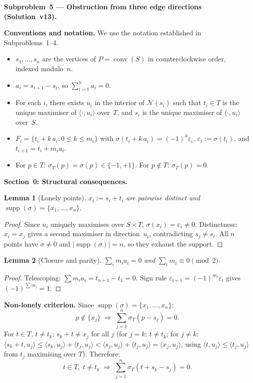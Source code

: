 \documentclass{article}
\newtheorem{lemma}{Lemma}
\begin{document}
\textbf{Subproblem~5 --- Obstruction from three edge directions (Solution~v13).}

\medskip
\noindent\textbf{Conventions and notation.}
We use the notation established in Subproblems~1--4.
\begin{itemize}
  \item $s_1,\dots,s_n$ are the vertices of $P=\operatorname{conv}(S)$ in counterclockwise
        order, indexed modulo~$n$.
  \item $a_i = s_{i+1}-s_i$, so $\sum_{i=1}^n a_i = 0$.
  \item For each $i$, there exists $u_i$ in the interior of $\mathcal{N}(s_i)$ such that
        $t_i\in T$ is the unique maximiser of $\langle\cdot,u_i\rangle$ over~$T$,
        and $s_i$ is the unique maximiser of $\langle\cdot,u_i\rangle$ over~$S$.
  \item $F_i = \{t_i+k\,a_i:0\le k\le m_i\}$ with
        $\sigma(t_i+k\,a_i)=(-1)^k\varepsilon_i$, $\varepsilon_i:=\sigma(t_i)$,
        and $t_{i+1}=t_i+m_i a_i$.
  \item For $p\in T$: $\sigma_T(p)=\sigma(p)\in\{-1,+1\}$.
        For $p\notin T$: $\sigma_T(p)=0$.
\end{itemize}

\bigskip
\noindent\textbf{Section~0: Structural consequences.}

\begin{lemma}[Lonely points]\label{lem:lonely}
$x_i:=s_i+t_i$ are pairwise distinct and
$\operatorname{supp}(\sigma)=\{x_1,\dots,x_n\}$.
\end{lemma}
\begin{proof}
Since $u_i$ uniquely maximises over $S\times T$, $\sigma(x_i)=\varepsilon_i\ne 0$.
Distinctness: $x_i=x_j$ gives a second maximiser in direction~$u_i$, contradicting $s_j\ne s_i$.
All $n$ points have $\sigma\ne 0$ and $|\operatorname{supp}(\sigma)|=n$, so they exhaust the support.
\end{proof}

\begin{lemma}[Closure and parity]\label{lem:closure}
$\sum_{i}m_i a_i=0$ and $\sum_i m_i\equiv 0\pmod{2}$.
\end{lemma}
\begin{proof}
Telescoping: $\sum m_i a_i=t_{n+1}-t_1=0$.
Sign rule $\varepsilon_{i+1}=(-1)^{m_i}\varepsilon_i$ gives $(-1)^{\sum m_i}=1$.
\end{proof}

\noindent\textbf{Non-lonely criterion.}
Since $\operatorname{supp}(\sigma)=\{x_1,\dots,x_n\}$:
\begin{equation}\label{eq:nonlonely}
  p\notin\{x_j\}
  \;\Longrightarrow\;
  \sum_{j=1}^n\sigma_T(p-s_j)=0.
\end{equation}
For $t\in T$, $t\ne t_k$: $s_k+t\ne x_j$ for all $j$ (for $j=k$: $t\ne t_k$; for $j\ne k$:
$\langle s_k+t,u_j\rangle\le\langle s_k,u_j\rangle+\langle t_j,u_j\rangle
<\langle s_j,u_j\rangle+\langle t_j,u_j\rangle=\langle x_j,u_j\rangle$,
using $\langle t,u_j\rangle\le\langle t_j,u_j\rangle$ from $t_j$ maximising over $T$).
Therefore:
\begin{equation}\label{eq:sigma0}
  t\in T,\;t\ne t_k
  \;\Longrightarrow\;
  \sum_{j=1}^n\sigma_T(t+s_k-s_j)=0.
\end{equation}
\end{document}
